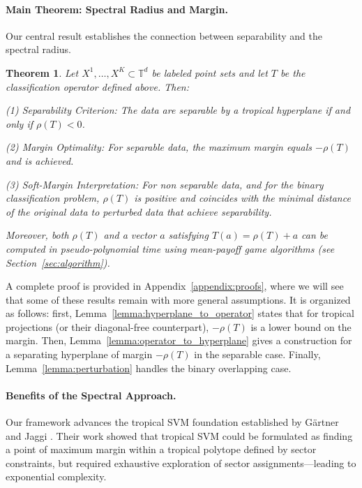 \documentclass{article}
\newtheorem{theorem}{Theorem}
\newcommand{\trop}{\mathbb{T}}
\begin{document}
\paragraph{Main Theorem: Spectral Radius and Margin.}
Our central result establishes the connection between separability and the spectral radius. 
\begin{theorem}\label{thm:spectral_separability}
Let $X^1,\ldots,X^K \subset \trop^d$ be labeled point sets and let $T$ be the classification operator defined above. Then:

(1) \textit{Separability Criterion:} The data are separable by a tropical hyperplane if and only if $\rho(T) < 0$.

(2) \textit{Margin Optimality:} For separable data, the maximum margin equals $-\rho(T)$ and is achieved.

(3) \textit{Soft-Margin Interpretation:} For non separable data, and for the binary classification problem, $\rho(T)$ is positive and coincides with the minimal distance of the original data to perturbed data that achieve separability.

Moreover, both $\rho(T)$ and a vector $a$ satisfying $T(a) = \rho(T)+a$ can be computed in pseudo-polynomial time using mean-payoff game algorithms (see Section~\ref{sec:algorithm}).
\end{theorem}
A complete proof is provided in Appendix~\ref{appendix:proofs}, where we will see that some of these results remain with more general assumptions.
It is organized as follows: first, Lemma~\ref{lemma:hyperplane_to_operator} states that for tropical projections (or their diagonal-free counterpart), $-\rho(T)$ is a lower bound on the margin.
Then, Lemma~\ref{lemma:operator_to_hyperplane} gives a construction for a separating hyperplane of margin $-\rho(T)$ in the separable case. Finally, Lemma~\ref{lemma:perturbation} handles the binary overlapping case.

\paragraph{Benefits of the Spectral Approach.} 
Our framework advances the tropical SVM foundation established by Gärtner and Jaggi \cite{gartner2008}. Their work showed that tropical SVM could be formulated as finding a point of maximum margin within a tropical polytope defined by sector constraints, but required exhaustive exploration of sector assignments—leading to exponential complexity.
\end{document}
